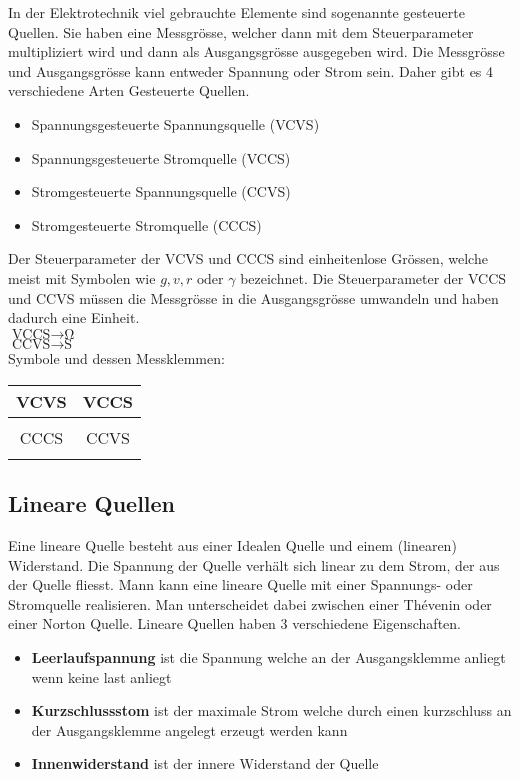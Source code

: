 In der Elektrotechnik viel gebrauchte Elemente sind sogenannte gesteuerte Quellen. 
Sie haben eine Messgrösse, welcher dann mit dem Steuerparameter multipliziert wird und dann als Ausgangsgrösse ausgegeben wird. 
Die Messgrösse und Ausgangsgrösse kann entweder Spannung oder Strom sein. 
Daher gibt es 4 verschiedene Arten Gesteuerte Quellen.\\
\begin{itemize}
    \item Spannungsgesteuerte Spannungsquelle (VCVS)
    \item Spannungsgesteuerte Stromquelle (VCCS)
    \item Stromgesteuerte Spannungsquelle (CCVS)
    \item Stromgesteuerte Stromquelle (CCCS)
\end{itemize}
Der Steuerparameter der VCVS und CCCS sind einheitenlose Grössen, welche meist mit Symbolen wie $g, v, r  \text{ oder } \gamma$ bezeichnet. 
Die Steuerparameter der VCCS und CCVS müssen die Messgrösse in die Ausgangsgrösse umwandeln und haben dadurch eine Einheit.\\
$\text{VCCS} \xrightarrow{} \unit{\ohm}$\\
$\text{CCVS} \xrightarrow{} \unit{\siemens}$\\
Symbole und dessen Messklemmen:\\

\begin{center}
\begin{tabular}{|c||c|}\hline
    VCVS & VCCS\\\hline
     & 
     \\\hline\hline
    CCCS & CCVS\\\hline
     & 
     \\\hline
\end{tabular}
\end{center}

\subsection{Lineare Quellen}

Eine lineare Quelle besteht aus einer Idealen Quelle und einem (linearen) Widerstand. 
Die Spannung der Quelle verhält sich linear zu dem Strom, der aus der Quelle fliesst. 
Mann kann eine lineare Quelle mit einer Spannungs- oder Stromquelle realisieren. 
Man unterscheidet dabei zwischen einer Thévenin oder einer Norton Quelle. 
Lineare Quellen haben 3 verschiedene Eigenschaften. 
\begin{itemize}
    \item \textbf{Leerlaufspannung} ist die Spannung welche an der Ausgangsklemme anliegt wenn keine last anliegt
    \item \textbf{Kurzschlussstom} ist der maximale Strom welche durch einen kurzschluss an der Ausgangsklemme angelegt erzeugt werden kann
    \item \textbf{Innenwiderstand} ist der innere Widerstand der Quelle
\end{itemize}

